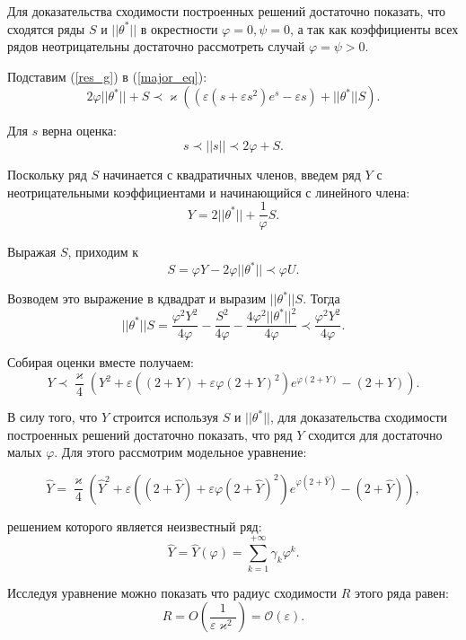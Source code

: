 Для доказательства сходимости построенных решений достаточно показать, что сходятся ряды $S$ и $||\theta^*||$ в окрестности $\varphi=0, \psi=0$, а так как коэффициенты всех рядов неотрицательны достаточно рассмотреть случай $\varphi=\psi>0$.

Подставим (\ref{res_g}) в (\ref{major_eq}):
\begin{equation*}
2\varphi ||\theta^*|| + S  \prec \varkappa \left( \left(\varepsilon (s + \varepsilon s^2)e^{s} - \varepsilon s \right) + ||\theta^*||S \right).
\label{major_eq2}
\end{equation*}

Для $s$ верна оценка:
$$s \prec ||s|| \prec 2 \varphi + S.$$

Поскольку ряд $S$ начинается с квадратичных членов, введем ряд $Y$ с неотрицательными коэффициентами и начинающийся с линейного члена:
$$Y = 2 ||\theta^*|| + \frac{1}{\varphi} S.$$

Выражая $S$, приходим к
$$S = \varphi Y - 2\varphi ||\theta^*|| \prec \varphi U.$$

Возводем это  выражение в кдвадрат и выразим $||\theta^*|| S$. Тогда
$$||\theta^*|| S = \frac{\varphi^2 Y^2}{4\varphi} - \frac{S^2}{4\varphi} - \frac{4 \varphi^2 ||\theta^*||^2}{4\varphi} \prec \frac{\varphi^2 Y^2}{4\varphi}.$$

Собирая оценки вместе получаем:
\begin{equation}
Y \prec \frac{\varkappa}{4} \left( Y^2 + \varepsilon \left( (2+Y) + \varepsilon \varphi (2+Y)^2 \right) e^{ \varphi (2+Y)} - (2+Y) \right).
\end{equation}

В силу того, что $Y$ строится используя $S$ и $||\theta^*||$, для доказательства сходимости построенных решений достаточно показать, что ряд $Y$ сходится для достаточно малых $\varphi$. Для этого рассмотрим модельное уравнение:

\begin{equation*}
\hat Y = \frac{\varkappa}{4} \left( \hat Y^2 + \varepsilon \left( (2+\hat Y) + \varepsilon \varphi (2+\hat Y)^2 \right) e^{\varphi (2+\hat Y)} - (2+\hat Y) \right),
\end{equation*}

решением которого является неизвестный ряд:
$$\hat Y = \hat Y(\varphi) = \sum_{k=1}^{+\infty} \gamma_k \varphi^k.$$

Исследуя уравнение можно показать что радиус сходимости $R$ этого ряда равен:
$$R =O \left( \frac{1}{\varepsilon \varkappa^2} \right) = \mathcal{O}(\varepsilon).$$
